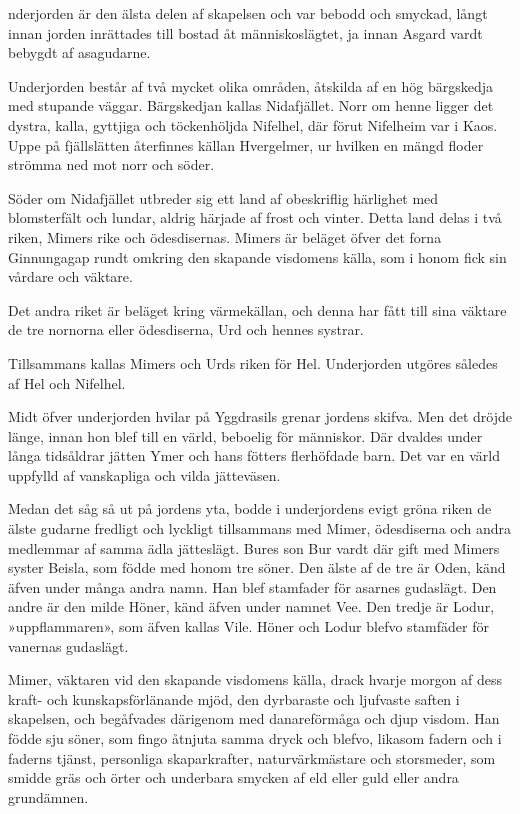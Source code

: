 
\dropcapU nderjorden är den älsta delen af skapelsen och var bebodd och smyckad,
långt innan jorden inrättades till bostad åt människoslägtet, ja innan
Asgard vardt bebygdt af asagudarne.

Underjorden består af två mycket olika områden, åtskilda af en hög
bärgskedja med stupande väggar. Bärgskedjan kallas Nidafjället. Norr om
henne ligger det dystra, kalla, gyttjiga och töckenhöljda Nifelhel, där
förut Nifelheim var i Kaos. Uppe på fjällslätten återfinnes källan
Hvergelmer, ur hvilken en mängd floder strömma ned mot norr och söder.

Söder om Nidafjället utbreder sig ett land af obeskriflig härlighet med
blomsterfält och lundar, aldrig härjade af frost och vinter. Detta land
delas i två riken, Mimers rike och ödesdisernas. Mimers är beläget öfver
det forna Ginnungagap rundt omkring den skapande visdomens källa, som i
honom fick sin vårdare och väktare.

Det andra riket är beläget kring värmekällan, och denna har fått till
sina väktare de tre nornorna eller ödesdiserna, Urd och hennes systrar.

Tillsammans kallas Mimers och Urds riken för Hel. Underjorden utgöres
således af Hel och Nifelhel.

Midt öfver underjorden hvilar på Yggdrasils grenar jordens skifva. Men
det dröjde länge, innan hon blef till en värld, beboelig för människor.
Där dvaldes under långa tidsåldrar jätten Ymer och hans fötters flerhöfdade barn. Det var en värld uppfylld af vanskapliga och vilda jätteväsen.

Medan det såg så ut på jordens yta, bodde i underjordens evigt gröna
riken de älste gudarne fredligt och lyckligt tillsammans med Mimer,
ödesdiserna och andra medlemmar af samma ädla jätteslägt. Bures son Bur
vardt där gift med Mimers syster Beisla, som födde med honom tre söner.
Den älste af de tre är Oden, känd äfven under många andra namn. Han blef
stamfader för asarnes gudaslägt. Den andre är den milde Höner, känd
äfven under namnet Vee. Den tredje är Lodur, »uppflammaren», som äfven
kallas Vile. Höner och Lodur blefvo stamfäder för vanernas gudaslägt.

Mimer, väktaren vid den skapande visdomens källa, drack hvarje morgon af
dess kraft- och kunskapsförlänande mjöd, den dyrbaraste och ljufvaste
saften i skapelsen, och begåfvades därigenom med danareförmåga och djup
visdom. Han födde sju söner, som fingo åtnjuta samma dryck och blefvo,
likasom fadern och i faderns tjänst, personliga skaparkrafter,
naturvärkmästare och storsmeder, som smidde gräs och örter och underbara
smycken af eld eller guld eller andra grundämnen.


